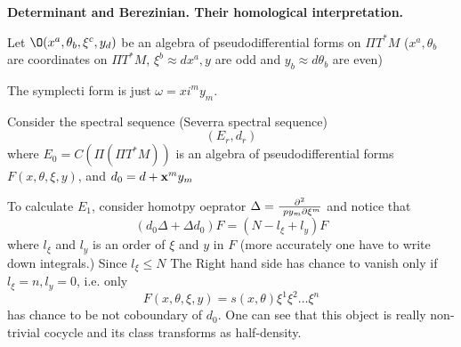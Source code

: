 \def\p{\partial}
\def\t {\tilde}
\def \m {\medskip}
\def\degree {{\bf {\rm degree}\,\,}}
\def \finish {${\,\,\vrule height1mm depth2mm width 8pt}$}





\def\a {\alpha}
\def\vare{{\varepsilon}}
\def\l {\lambda}
\def\s {{\sigma}}

\def\G {{\Gamma}}

\def\A {{\bf A}}
\def\C {{\bf C}}
\def\E  {{\bf E}}
\def\K {{\bf K}}
\def\N {{\bf N}}
\def\Q {{\bf Q}}
\def\R  {{\bf R}}
\def\V {{\cal V}}
\def \X   {{\bf X}}
\def \Y   {{\bf Y}}
\def\Z {{\bf Z}}



\def\ac {{\bf a}}
\def\e{{\bf e}}
\def\f {{\bf f}}
\def\n {{\bf n}}
\def\r {{\bf r}}
\def\v {{\bf v}}
\def \x   {{\bf x}}
\def \y   {{\bf y}}
\def\w {\omega}

\def\pt {{\bf pt}}
\def \exer {{\sl Exercise$\,\,$}}

 \centerline   {\bf Determinant and Berezinian. Their homological interpretation.}


\bigskip



   Let   $\O(x^a,\theta_b,\xi^c,y_d)$ be an algebra of pseudodifferential forms
on $\Pi T^*M$ ($x^a,\theta_b$ are coordinates on $\Pi T^*M$, 
$\xi^b\approx dx^a, y$ are odd and $y_b\approx d\theta_b$ are even)

   The symplecti form is just $\w=xi^m y_m$.

   Consider the spectral sequence (Severra spectral sequence)
                     $$
               (E_r,d_r)
                     $$
where $E_0=C(\Pi(\Pi T^*M))$ is an algebra of pseudodifferential forms
  $F(x,\theta,\xi,y)$, and $d_0=d+\x^m y_m$


To calculate $E_1$, consider homotpy oeprator 
$\Delta={\p^2\over \ p y_m\p \xi^m}$ and notice that
                   $$
      (d_0\Delta+\Delta d_0) F=(N-l_\xi+l_y)F
                   $$
where $l_\xi$ and $l_y$ is an order of $\xi$ and $y$ in $F$
(more accurately one have to write down integrals.)
   Since $l_\xi\leq N$
The Right hand side has chance  to vanish only if $l_\xi=n,l_y=0$, i.e. only
                   $$
    F(x,\theta, \xi,y)=s(x,\theta)\xi^1\xi^2\dots\xi^n
                   $$ 
has chance to be not coboundary of  $d_0$. One can see that this object
is really non-trivial cocycle and its class transforms as half-density.



\bye

